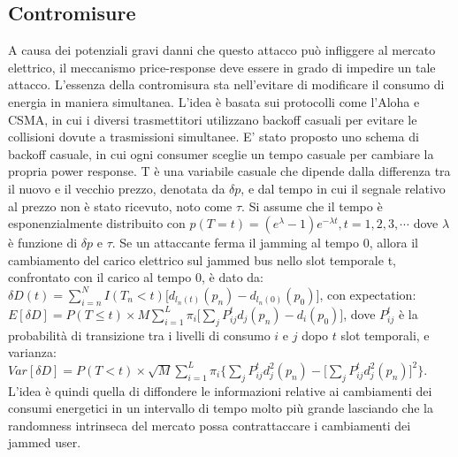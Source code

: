 \subsection{Contromisure}
A causa dei potenziali gravi danni che questo attacco può infliggere al mercato elettrico, il meccanismo price-response deve essere in grado di impedire un tale attacco. L'essenza della contromisura sta nell'evitare di modificare il consumo di energia in maniera simultanea. L'idea è basata sui protocolli come l'Aloha e CSMA, in cui i diversi trasmettitori utilizzano backoff casuali per evitare le collisioni dovute a trasmissioni simultanee.\newline\newline
E' stato proposto uno schema di backoff casuale, in cui ogni consumer sceglie un tempo casuale per cambiare la propria power response. T è una variabile casuale che dipende dalla differenza tra il nuovo e il vecchio prezzo, denotata da $\delta p$, e dal tempo in cui il segnale relativo al prezzo non è stato ricevuto, noto come $\tau$. Si assume che il tempo è esponenzialmente distribuito con\newline
\indent$p(T = t) = (e^{\lambda} - 1) e^{- \lambda t}, t = 1,2,3,\cdots$
\newline
dove $\lambda$ è funzione di $\delta p$ e $\tau$. Se un attaccante ferma il jamming al tempo 0, allora il cambiamento del carico elettrico sul jammed bus nello slot temporale t, confrontato con il carico al tempo 0, è dato da:\newline
\indent$\delta D(t) = \sum\limits_{i=n}^{N} I(T_{n} < t) \Big[d_{l_{n}(t)}(p_{n}) - d_{l_{n}(0)}(p_{0})\Big]$,
\newline
con expectation:\newline
\indent$E[\delta D] = P(T \leq t) \times M \sum\limits_{i=1}^{L} \pi_{i} \Big[\sum\limits_{j} P_{ij}^{t}d_{j}(p_{n}) - d_{i}(p_{0})\Big]$,\newline
dove $P_{ij}^{t}$ è la probabilità di transizione tra i livelli di consumo $i$ e $j$ dopo $t$ slot temporali, e varianza:\newline
\indent$Var[\delta D] = P(T < t) \times \sqrt{M} \sum\limits_{i=1}^{L} \pi_{i} \Big\{\sum\limits_{j}P_{ij}^{t}d_{j}^{2}(p_{n}) - \Big[\sum\limits_{j}P_{ij}^{t}d_{j}^{2}(p_{n})\Big]^2\Big\}$.\newline
L'idea è quindi quella di diffondere le informazioni relative ai cambiamenti dei consumi energetici in un intervallo di tempo molto più grande lasciando che la randomness intrinseca del mercato possa contrattaccare i cambiamenti dei jammed user.
